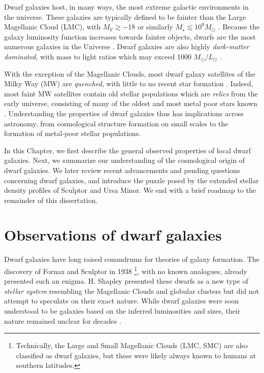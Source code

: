 Dwarf galaxies host, in many ways, the most extreme galactic
environments in the universe. These galaxies are typically defined to be
fainter than the Large Magellanic Cloud (LMC), with \(M_V \gtrsim -18\)
or similarly \(M_\star \lesssim 10^9 M_\odot\)
\citep[e.g.,][]{hodge1971, mcconnachie2012}. Because the galaxy
luminosity function increases towards fainter objects, dwarfs are the
most numerous galaxies in the Universe
\citep[e.g.,][]{blanton+2005, mao+2021}. Dwarf galaxies are also highly
\emph{dark-matter dominated}, with mass to light ratios which may exceed
1000 \(M_\odot/ L_\odot\) \citep[e.g.,][]{simon+geha2007, hayashi+2023}.

With the exception of the Magellanic Clouds, most dwarf galaxy
satellites of the Milky Way (MW) are \emph{quenched}, with little to no
recent star formation \citep[e.g.,][]{weisz+2014}. Indeed, most faint MW
satellites contain old stellar populations which are \emph{relics} from
the early universe, consisting of many of the oldest and most metal poor
stars known \citep{simon2019}. Understanding the properties of dwarf
galaxies thus has implications across astronomy, from cosmological
structure formation on small scales to the formation of metal-poor
stellar populations.

In this Chapter, we first describe the general observed properties of
local dwarf galaxies. Next, we summarize our understanding of the
cosmological origin of dwarf galaxies. We later review recent
advancements and pending questions concerning dwarf galaxies, and
introduce the puzzle posed by the extended stellar density profiles of
Sculptor and Ursa Minor. We end with a brief roadmap to the remainder of
this dissertation.

\section{Observations of dwarf
galaxies}\label{observations-of-dwarf-galaxies}

Dwarf galaxies have long raised conundrums for theories of galaxy
formation. The discovery of Fornax and Sculptor in 1938
\citep{shapley1938}\footnote{Technically, the Large and Small Magellanic
  Clouds (LMC, SMC) are also classified as dwarf galaxies, but these
  were likely always known to humans at southern latitudes.}, with no
known analogues, already presented such an enigma. H. Shapley presented
these dwarfs as a new type of \emph{stellar system} resembling the
Magellanic Clouds and globular clusters but did not attempt to speculate
on their exact nature. While dwarf galaxies were soon understood to be
galaxies based on the inferred luminosities and sizes, their nature
remained unclear for decades
\citep[e.g.,][]{hodge1971, gallagher+wyse1994}.

